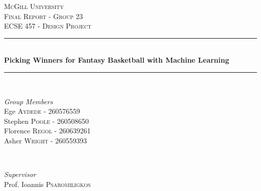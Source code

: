 \documentclass[11pt]{article}
\begin{document}
\begin{titlepage} %
	\newcommand{\HRule}{\rule{\linewidth}{0.5mm}} %
	
	\center %
	
	
	\textsc{\LARGE McGill University}\\[1.5cm] %
	
	\textsc{\Large Final Report - Group 23}\\[0.5cm] %
	
	\textsc{\large ECSE 457 - Design Project}\\[0.5cm] %
	
	
	\HRule\\[0.4cm]
	
	{\huge\bfseries Picking Winners for Fantasy Basketball with Machine Learning}\\[0.4cm] %
	
	\HRule\\[1.5cm]
	
	
	\begin{minipage}{0.5\textwidth}
		\begin{flushleft}
			\large
			\textit{Group Members}\\
			Ege \textsc{Aydede} - {\small 260576559}\\
			Stephen \textsc{Poole} - {\small 260508650}\\
			Florence \textsc{Regol} - {\small 260639261}\\
			Asher \textsc{Wright} - {\small 260559393}
		\end{flushleft}
	\end{minipage}
	~
	\begin{minipage}{0.4\textwidth}
		\begin{flushright}
			\large
			\textit{Supervisor}\\
			Prof. Ioannis \textsc{Psaromiligkos} 
		\end{flushright}
	\end{minipage}
	


\end{titlepage}
\end{document}
